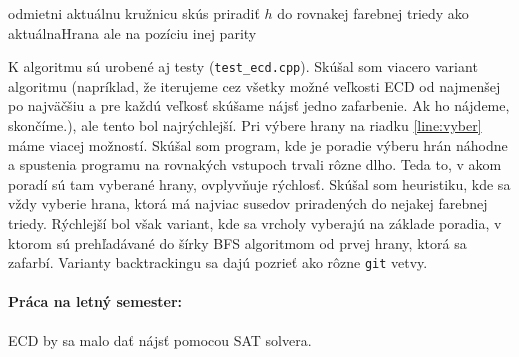 \documentclass[11pt]{article}
\begin{document}
\begin{algorithmic}[1]
        \State odmietni aktuálnu kružnicu
        \State \Return
        \State {} 
        \State \Return
        \Else
            \State skús priradiť $h$ do rovnakej farebnej triedy ako aktuálnaHrana ale na pozíciu inej parity
        \EndFor
        \EndIf
        
    \EndFunction
\end{algorithmic}

K algoritmu sú urobené aj testy (\texttt{test\_ecd.cpp}). Skúšal som viacero variant algoritmu (napríklad, že 
iterujeme cez všetky možné veľkosti ECD od najmenšej po najväčšiu a pre každú veľkosť skúšame nájsť jedno zafarbenie.
Ak ho nájdeme, skončíme.), ale tento bol najrýchlejší. Pri výbere hrany na riadku \ref{line:vyber}
máme viacej možností. Skúšal som program, kde je poradie výberu hrán náhodne a spustenia
programu na rovnakých vstupoch trvali rôzne dlho. Teda to, v akom poradí sú tam vyberané 
hrany, ovplyvňuje rýchlosť. Skúšal som heuristiku, kde sa vždy vyberie hrana, ktorá má najviac
susedov priradených do nejakej farebnej triedy. Rýchlejší bol však variant, kde sa vrcholy vyberajú
na základe poradia, v ktorom sú prehľadávané do šírky BFS algoritmom od prvej hrany, ktorá sa zafarbí.
Varianty backtrackingu sa dajú pozrieť ako rôzne \texttt{git} vetvy. 

\paragraph{Práca na letný semester:} ECD by sa malo dať nájsť pomocou SAT solvera.
\printbibliography
\end{document}
